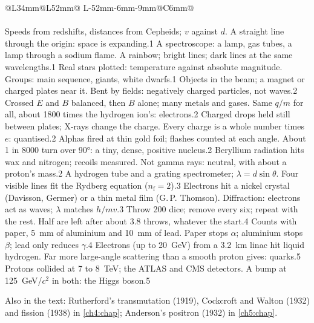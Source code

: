 {\small
\setlength\LTpre{4pt}\setlength\LTpost{6pt}
\renewcommand\arraystretch{1.1}
\begin{longtable}{@{}L{34mm}@{\hspace{3mm}}L{52mm}@{\hspace{3mm}}%
    L{\dimexpr\linewidth-34mm-52mm-6mm-9mm\relax}@{\hspace{3mm}}C{6mm}@{}}
  \kxhead\\\hline\endfirsthead
  \kxhead\\\hline\endhead
    {Speeds from redshifts, distances from Cepheids; $v$ against $d$.}
    {A straight line through the origin: space is expanding.}{1}
    {A spectroscope: a lamp, gas tubes, a lamp through a sodium flame.}
    {A rainbow; bright lines; dark lines at the same wavelengths.}{1}
    {Real stars plotted: temperature against absolute magnitude.}
    {Groups: main sequence, giants, white dwarfs.}{1}
  \kxnext
    {Objects in the beam; a magnet or charged plates near it.}
    {Bent by fields: negatively charged particles, not waves.}{2}
    {Crossed $E$ and $B$ balanced, then $B$ alone; many metals and gases.}
    {Same $q/m$ for all, about 1800 times the hydrogen ion's: electrons.}{2}
    {Charged drops held still between plates; X-rays change the charge.}
    {Every charge is a whole number times $e$: quantised.}{2}
    {Alphas fired at thin gold foil; flashes counted at each angle.}
    {About 1 in 8000 turn over \ang{90}: a tiny, dense, positive nucleus.}{2}
    {Beryllium radiation hits wax and nitrogen; recoils measured.}
    {Not gamma rays: neutral, with about a proton's mass.}{2}
  \kxnext
    {A hydrogen tube and a grating spectrometer; $\lambda = d\sin\theta$.}
    {Four visible lines fit the Rydberg equation ($n_\mathrm{f} = 2$).}{3}
    {Electrons hit a nickel crystal (Davisson, Germer) or a thin metal film
     (G.\,P. Thomson).}
    {Diffraction: electrons act as waves; $\lambda$ matches $h/mv$.}{3}
  \kxnext
    {Throw 200 dice; remove every six; repeat with the rest.}
    {Half are left after about 3.8 throws, whatever the start.}{4}
    {Counts with paper, \qty{5}{mm} of aluminium and \qty{10}{mm} of lead.}
    {Paper stops $\alpha$; aluminium stops $\beta$; lead only reduces $\gamma$.}{4}
  \kxnext
    {Electrons (up to \qty{20}{GeV}) from a \qty{3.2}{km} linac hit liquid hydrogen.}
    {Far more large-angle scattering than a smooth proton gives: quarks.}{5}
    {Protons collided at 7 to \qty{8}{TeV}; the ATLAS and CMS detectors.}
    {A bump at \qty{125}{GeV}/$c^2$ in both: the Higgs boson.}{5}
\end{longtable}}

Also in the text: Rutherford's transmutation (1919), Cockcroft and Walton (1932) and
fission (1938) in \cref{ch4:chap}; Anderson's positron (1932) in \cref{ch5:chap}.
